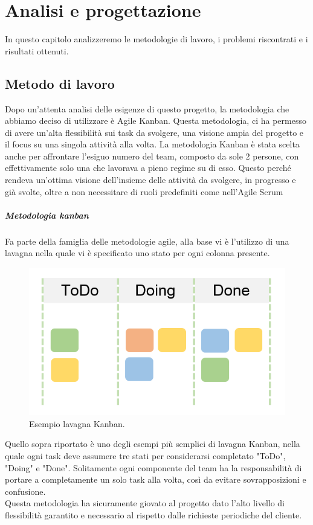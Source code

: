 \chapter{Analisi e progettazione}\label{ch:analisi-e-progettazione}
In questo capitolo analizzeremo le metodologie di lavoro, i problemi riscontrati e i risultati ottenuti.
\section{Metodo di lavoro}
Dopo un'attenta analisi delle esigenze di questo progetto, la metodologia che abbiamo deciso di utilizzare è Agile Kanban. Questa metodologia, ci ha permesso di avere un'alta flessibilità sui task da svolgere, una visione ampia del progetto e il focus su una singola attività alla volta.
La metodologia Kanban è stata scelta anche per affrontare l'esiguo numero del team, composto da sole 2 persone, con effettivamente solo una che lavorava a pieno regime su di esso.
Questo perché rendeva un'ottima visione dell'insieme delle attività da svolgere, in progresso e già svolte, oltre a non necessitare di ruoli predefiniti come nell'\Gls{Agile Scrum}
\paragraph{Metodologia kanban}
Fa parte della famiglia delle metodologie agile, alla base vi è l'utilizzo di una lavagna nella quale vi è specificato uno stato per ogni colonna presente.
\begin{figure}[h!]
	\centering
	\includegraphics[scale=0.3]{figures/kanban-board}
	\caption[Esempio lavagna Kanban.]{Esempio lavagna Kanban.
		\label{fig:kanban}}
\end{figure}	
Quello sopra riportato è uno degli esempi più semplici di lavagna Kanban, nella quale ogni task deve assumere tre stati per considerarsi completato "ToDo", "Doing" e "Done". Solitamente ogni componente del team ha la responsabilità di portare a completamente un solo task alla volta, così da evitare sovrapposizioni e confusione.
\\ 
Questa metodologia ha sicuramente giovato al progetto dato l'alto livello di flessibilità garantito e necessario al rispetto dalle richieste periodiche del cliente.
